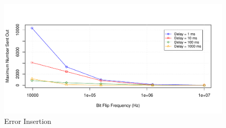\begin{figure}
\centering
\includegraphics[scale=0.4]{figures/experiment1.pdf}
\caption{Error Insertion}
\vspace{5pt}
\label{fig:exp1_result}
\end{figure}

